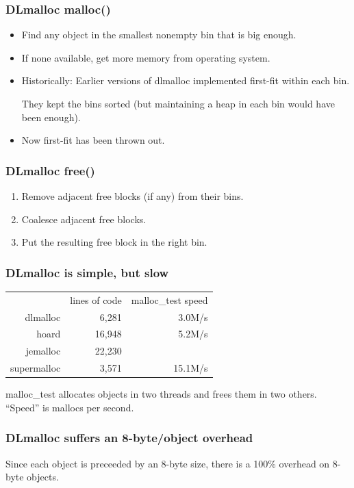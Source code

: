 \documentclass[xcolor=dvipsnames,14pt]{beamer}
\begin{document}
\begin{frame}
\frametitle{DLmalloc malloc()}

\begin{itemize}
\item Find any object in the smallest nonempty bin that is big enough.

\item If none available, get  more memory from operating system.

\item Historically: Earlier versions of dlmalloc implemented first-fit within each bin.

They kept the bins sorted (but maintaining a heap in each bin would
have been enough).

\item Now first-fit has been thrown out.
\end{itemize}
\end{frame}
  
\begin{frame}
\frametitle{DLmalloc free()}

\begin{enumerate}
\item Remove adjacent free blocks (if any) from their bins.
\item Coalesce adjacent free blocks.
\item Put the resulting free block in the right bin.
\end{enumerate}
\end{frame}

\begin{frame}
\frametitle{DLmalloc is simple, but slow}

\begin{tabular}{rrr}
         & lines of code & malloc\_test speed \\
dlmalloc &    6,281 &  3.0M/s \\
hoard    &   16,948 &  5.2M/s \\
jemalloc    & 22,230 & \\
supermalloc & 3,571 & 15.1M/s \\
\end{tabular}

\vfill

malloc\_test allocates objects in two threads and frees them in
two others.  ``Speed'' is mallocs per second.

\end{frame}

\begin{frame}
\frametitle{DLmalloc suffers an 8-byte/object overhead}

Since each object is preceeded by an 8-byte size, there is a 100\%
overhead on 8-byte objects.

\end{frame}
\end{document}
